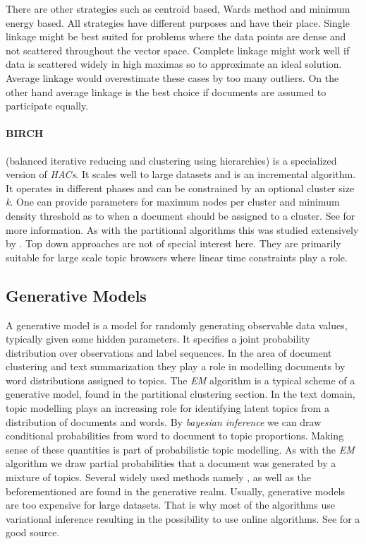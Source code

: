     There are other strategies such as centroid based, Wards method and minimum energy based.
    All strategies have different purposes and have their place. Single linkage might be best suited for problems where the data points are dense and not scattered throughout the vector space. Complete linkage might work well if data is scattered widely in high maximas so to approximate an ideal solution. Average linkage would overestimate these cases by too many outliers. On the other hand average linkage is the best choice if documents are assumed to  participate equally. 

    \paragraph{BIRCH} (balanced iterative reducing and clustering using hierarchies) is a specialized version of \emph{HACs}. It scales well to large datasets and is an incremental algorithm. It operates in different phases and can be constrained by an optional cluster size \emph{k}. One can provide parameters for maximum nodes per cluster and minimum density threshold as to when a document should be assigned to a cluster. See 
    \cite{BIRCH1996} for more information. As with the partitional algorithms this was studied extensively by \cite{ClusteringBooAggarwalk2013, ClusterAlgoSurveyIBM, IRBook2008}. Top down approaches are not of special interest here. They are primarily suitable for large scale topic browsers where linear time constraints play a role.

    \subsection{Generative Models}   
    \label{sec:generative}

      A generative model is a model for randomly generating observable data values, typically given some hidden parameters. It specifies a joint probability distribution over observations and label sequences. In the area of document clustering and text summarization they play a role in modelling documents by word distributions assigned to topics. The \emph{EM} algorithm is a typical scheme of a generative model, found in the partitional clustering section. In the text domain, topic modelling plays an increasing role for identifying latent topics from a distribution of documents and words. By \emph{bayesian inference} we can draw conditional probabilities from word to document to topic proportions. Making sense of these quantities is part of probabilistic topic modelling. As with the \emph{EM} algorithm we draw partial probabilities that a document was generated by a mixture of topics. Several widely used methods namely \ldafull{}, \hdpfull{} as well as the beforementioned \lsafull{} are found in the generative realm. Usually, generative models are too expensive for large datasets. That is why most of the algorithms use variational inference resulting in the possibility to use online algorithms. See \cite{BishopML} for a good source.

